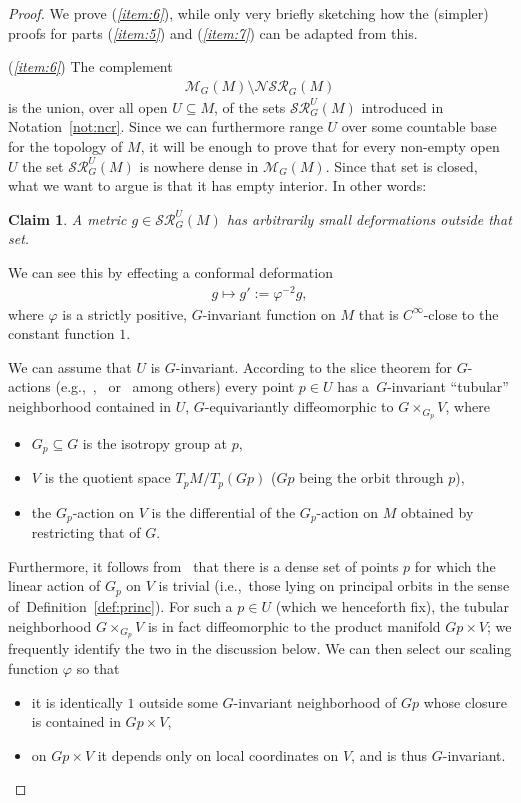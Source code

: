 \documentclass[pdftex]{sigma}%
\numberwithin{equation}{section}
\newtheorem{Claim}[Theorem]{Claim}
 { \theoremstyle{definition}
\newtheorem{Definition}[Theorem]{Definition}
\newtheorem{Note}[Theorem]{Note}
\newtheorem{Example}[Theorem]{Example}
\newtheorem{Notation}[Theorem]{Notation}
\newtheorem{Remark}[Theorem]{Remark} }
\begin{document}
\begin{proof}
 We prove ({\it \ref{item:6}}), while only very briefly sketching how the (simpler) proofs for parts ({\it \ref{item:5}}) and ({\it \ref{item:7}}) can be adapted from this.

 ({\it \ref{item:6}}) The complement
 \begin{gather*}
 \mathcal{M}_G(M)\setminus \mathcal{NSR}_G(M)
 \end{gather*}
 is the union, over all open $U\subseteq M$, of the sets $\mathcal{SR}^U_G(M)$ introduced in Notation~\ref{not:ncr}. Since we can furthermore range $U$ over some countable base for the topology of $M$, it will be enough to prove that for every non-empty open $U$ the set $\mathcal{SR}^U_G(M)$ is nowhere dense in $\mathcal{M}_G(M)$. Since that set is closed, what we want to argue is that it has empty interior. In other words:

 \begin{Claim}
A metric $g\in \mathcal{SR}^U_G(M)$ has arbitrarily small deformations outside that set.
 \end{Claim}

 We can see this by effecting a conformal deformation
 \begin{gather*}
 g\mapsto g':=\varphi^{-2} g,
 \end{gather*}
 where $\varphi$ is a strictly positive, $G$-invariant function on $M$ that is $C^{\infty}$-close to the constant function $1$.

 We can assume that $U$ is $G$-invariant. According to the slice theorem for $G$-actions (e.g.,~\cite[Th\'eor\`eme, p.~139]{ksz},~\cite[Theorem~1]{my} or~\cite[Theorem~I.2.1]{aud} among others) every point $p\in U$ has a~$G$-invariant ``tubular'' neighborhood contained in $U$, $G$-equivariantly diffeomorphic to $G\times_{G_p}V$, where
 \begin{itemize}\itemsep=0pt
 \item $G_p\subseteq G$ is the isotropy group at $p$,
 \item $V$ is the quotient space $T_pM/T_p (Gp)$ ($Gp$ being the orbit through $p$),
 \item the $G_p$-action on $V$ is the differential of the $G_p$-action on $M$ obtained by restricting that of $G$.
 \end{itemize}
 Furthermore, it follows from~\cite[Proposition~I.2.5]{aud} that there is a dense set of points $p$ for which the linear action of $G_p$ on $V$ is trivial (i.e.,~those lying on principal orbits in the sense of~Definition~\ref{def:princ}). For such a $p\in U$ (which we henceforth fix), the tubular neighborhood $G\times_{G_p}V$ is in fact diffeomorphic to the product manifold $Gp\times V$; we frequently identify the two in the discussion below. We can then select our scaling function $\varphi$ so that
 \begin{itemize}\itemsep=0pt
 \item it is identically $1$ outside some $G$-invariant neighborhood of $Gp$ whose closure is contained in $Gp\times V$,
 \item on $Gp\times V$ it depends only on local coordinates on $V$, and is thus $G$-invariant.
 \end{itemize}


\end{proof}
\end{document}
